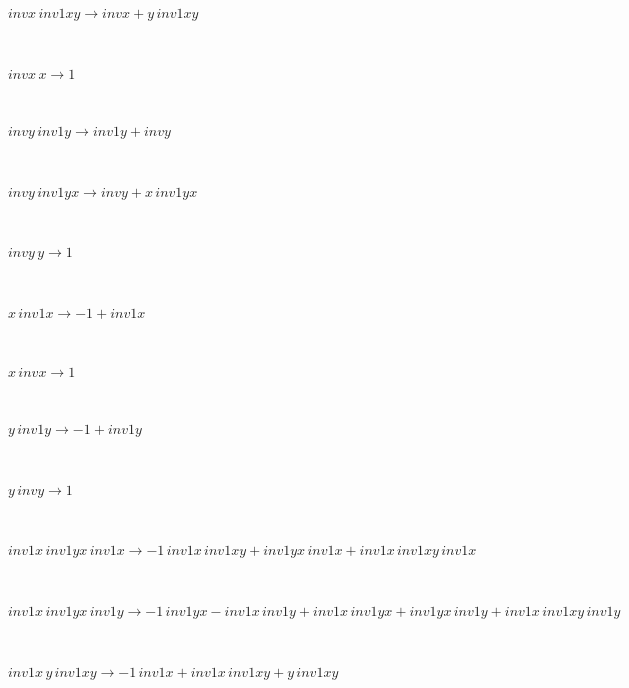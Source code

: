 \documentclass[rep10,leqno]{report}
\begin{document}
\begin{minipage}{6in}
$
invx\,
 inv1xy\rightarrow invx + y\,
 inv1xy
$
\end{minipage}\medskip \\
\begin{minipage}{6in}
$
invx\,
 x\rightarrow 1
$
\end{minipage}\medskip \\
\begin{minipage}{6in}
$
invy\,
 inv1y\rightarrow inv1y + invy
$
\end{minipage}\medskip \\
\begin{minipage}{6in}
$
invy\,
 inv1yx\rightarrow invy + x\,
 inv1yx
$
\end{minipage}\medskip \\
\begin{minipage}{6in}
$
invy\,
 y\rightarrow 1
$
\end{minipage}\medskip \\
\begin{minipage}{6in}
$
x\,
 inv1x\rightarrow -1 + inv1x
$
\end{minipage}\medskip \\
\begin{minipage}{6in}
$
x\,
 invx\rightarrow 1
$
\end{minipage}\medskip \\
\begin{minipage}{6in}
$
y\,
 inv1y\rightarrow -1 + inv1y
$
\end{minipage}\medskip \\
\begin{minipage}{6in}
$
y\,
 invy\rightarrow 1
$
\end{minipage}\medskip \\
\begin{minipage}{6in}
$
inv1x\,
 inv1yx\,
 inv1x\rightarrow -1\,
 inv1x\,
 inv1xy + inv1yx\,
 inv1x + inv1x\,
 inv1xy\,
 inv1x
$
\end{minipage}\medskip \\
\begin{minipage}{6in}
$
inv1x\,
 inv1yx\,
 inv1y\rightarrow -1\,
 inv1yx - inv1x\,
 inv1y + inv1x\,
 inv1yx + inv1yx\,
 inv1y + inv1x\,
 inv1xy\,
 inv1y
$
\end{minipage}\medskip \\
\begin{minipage}{6in}
$
inv1x\,
 y\,
 inv1xy\rightarrow -1\,
 inv1x + inv1x\,
 inv1xy + y\,
 inv1xy
$
\end{minipage}\medskip \\
\end{document}
